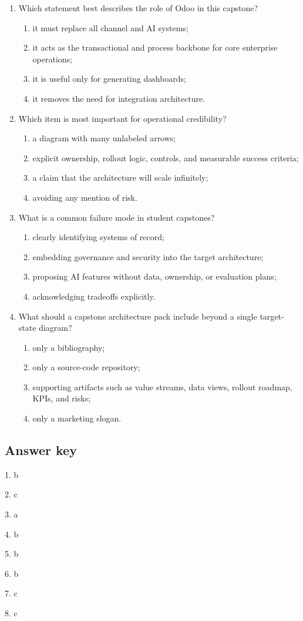 \begin{enumerate}
  \item Which statement best describes the role of Odoo in this capstone?
  \begin{enumerate}
    \item it must replace all channel and AI systems;
    \item it acts as the transactional and process backbone for core enterprise operations;
    \item it is useful only for generating dashboards;
    \item it removes the need for integration architecture.
  \end{enumerate}

  \item Which item is most important for operational credibility?
  \begin{enumerate}
    \item a diagram with many unlabeled arrows;
    \item explicit ownership, rollout logic, controls, and measurable success criteria;
    \item a claim that the architecture will scale infinitely;
    \item avoiding any mention of risk.
  \end{enumerate}

  \item What is a common failure mode in student capstones?
  \begin{enumerate}
    \item clearly identifying systems of record;
    \item embedding governance and security into the target architecture;
    \item proposing AI features without data, ownership, or evaluation plans;
    \item acknowledging tradeoffs explicitly.
  \end{enumerate}

  \item What should a capstone architecture pack include beyond a single target-state diagram?
  \begin{enumerate}
    \item only a bibliography;
    \item only a source-code repository;
    \item supporting artifacts such as value streams, data views, rollout roadmap, KPIs, and risks;
    \item only a marketing slogan.
  \end{enumerate}
\end{enumerate}

\subsection*{Answer key}
1. b

2. c

3. a

4. b

5. b

6. b

7. c

8. c

